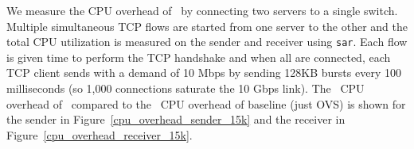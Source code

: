 %
%
%

We measure the CPU overhead of~\acdc{} by connecting two servers to a single switch. 
Multiple simultaneous TCP flows are started from one server to the other and the total CPU utilization
is measured on the sender and receiver using {\tt sar}. Each flow is given time to perform the TCP handshake
and when all are connected, each TCP client sends with a demand of 10 Mbps by sending 128KB bursts every 100 milliseconds (so 1,000 connections saturate the 10 Gbps link). 
The~ CPU overhead of~\acdc{} compared to the~ CPU overhead of baseline (\ie{}just OVS) 
is shown for the sender in Figure~\ref{cpu_overhead_sender_15k}
 and the receiver in Figure~\ref{cpu_overhead_receiver_15k}.~


